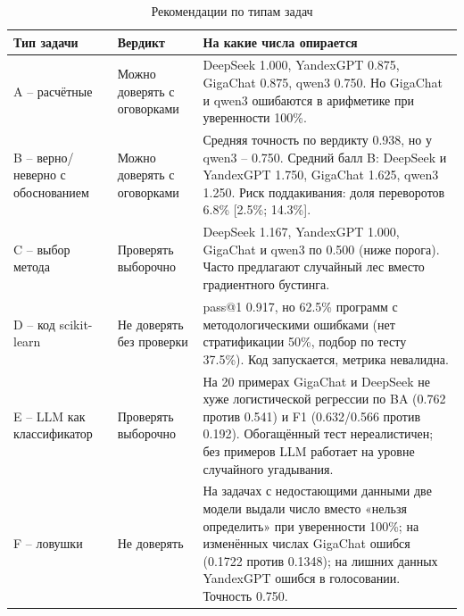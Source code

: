 \documentclass{bmstu}
\begin{document}
\begin{table}[htbp]
\centering
\caption{Рекомендации по типам задач}
\label{tab:recommendations}
\begin{tabular}{|p{}|p{}|p{}|}
\hline
Тип задачи & Вердикт & На какие числа опирается \\
\hline
A -- расчётные & Можно доверять с оговорками & DeepSeek 1.000, YandexGPT 0.875, GigaChat 0.875, qwen3 0.750. Но GigaChat и qwen3 ошибаются в арифметике при уверенности 100\%. \\
\hline
B -- верно/неверно с обоснованием & Можно доверять с оговорками & Средняя точность по вердикту 0.938, но у qwen3 -- 0.750. Средний балл B: DeepSeek и YandexGPT 1.750, GigaChat 1.625, qwen3 1.250. Риск поддакивания: доля переворотов 6.8\% [2.5\%; 14.3\%]. \\
\hline
C -- выбор метода & Проверять выборочно & DeepSeek 1.167, YandexGPT 1.000, GigaChat и qwen3 по 0.500 (ниже порога). Часто предлагают случайный лес вместо градиентного бустинга. \\
\hline
D -- код scikit-learn & Не доверять без проверки & pass@1 0.917, но 62.5\% программ с методологическими ошибками (нет стратификации 50\%, подбор по тесту 37.5\%). Код запускается, метрика невалидна. \\
\hline
E -- LLM как классификатор & Проверять выборочно & На 20 примерах GigaChat и DeepSeek не хуже логистической регрессии по BA (0.762 против 0.541) и F1 (0.632/0.566 против 0.192). Обогащённый тест нереалистичен; без примеров LLM работает на уровне случайного угадывания. \\
\hline
F -- ловушки & Не доверять & На задачах с недостающими данными две модели выдали число вместо «нельзя определить» при уверенности 100\%; на изменённых числах GigaChat ошибся (0.1722 против 0.1348); на лишних данных YandexGPT ошибся в голосовании. Точность 0.750. \\
\hline
\end{tabular}
\vspace{-10pt}
\end{table}
\end{document}
